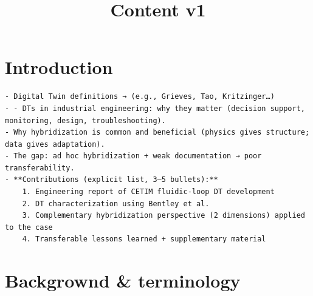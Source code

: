 \documentclass[
]{article}
\title{Content v1}
\author{}
\date{}
\begin{document}
\maketitle

\section{Introduction}\label{introduction}

\begin{verbatim}
- Digital Twin definitions → (e.g., Grieves, Tao, Kritzinger…)
- - DTs in industrial engineering: why they matter (decision support, monitoring, design, troubleshooting).
- Why hybridization is common and beneficial (physics gives structure; data gives adaptation).
- The gap: ad hoc hybridization + weak documentation → poor transferability.
- **Contributions (explicit list, 3–5 bullets):**
    1. Engineering report of CETIM fluidic-loop DT development
    2. DT characterization using Bentley et al.
    3. Complementary hybridization perspective (2 dimensions) applied to the case
    4. Transferable lessons learned + supplementary material
\end{verbatim}

\section{Backgrownd \& terminology}\label{backgrownd-terminology}
\end{document}
